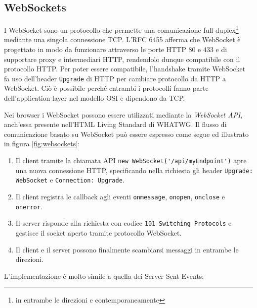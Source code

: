 \documentclass[12pt,a4paper,openright]{report}
\begin{document}
\subsection{WebSockets}
I WebSocket sono un protocollo che permette una comunicazione full-duplex\footnote{in entrambe le direzioni e contemporaneamente} mediante una singola connessione TCP.
L'RFC 6455 afferma che WebSocket è progettato in modo da funzionare attraverso le porte HTTP 80 e 433 e di supportare proxy e intermediari HTTP, rendendolo dunque compatibile con il protocollo HTTP\cite{websockets_rfc}. Per poter essere compatibile, l'handshake tramite WebSocket fa uso dell'header \lstinline{Upgrade} di HTTP per cambiare protocollo da HTTP a WebSocket. Ciò è possibile perché entrambi i protocolli fanno parte dell'application layer nel modello OSI e dipendono da TCP.

\bigskip

Nei browser i WebSocket possono essere utilizzati mediante la \textit{WebSocket API}, anch'essa presente nell'HTML Living Standard di WHATWG.
Il flusso di comunicazione basato su WebSocket può essere espresso come segue\cite{websockets} ed illustrato in figura \ref{fig:websockets}:
\begin{enumerate}
  \item Il client tramite la chiamata API \lstinline{new WebSocket('/api/myEndpoint')} apre una nuova connessione HTTP, specificando nella richiesta gli header \lstinline{Upgrade: WebSocket} e \lstinline{Connection: Upgrade}.
  \item Il client registra le callback agli eventi \lstinline{onmessage}, \lstinline{onopen}, \lstinline{onclose} e \lstinline{onerror}.
  \item Il server risponde alla richiesta con codice \lstinline{101 Switching Protocols} e gestisce il socket aperto tramite protocollo WebSocket.
  \item Il client e il server possono finalmente scambiarsi messaggi in entrambe le direzioni.
\end{enumerate}
L'implementazione è molto simile a quella dei Server Sent Events:

\end{document}
